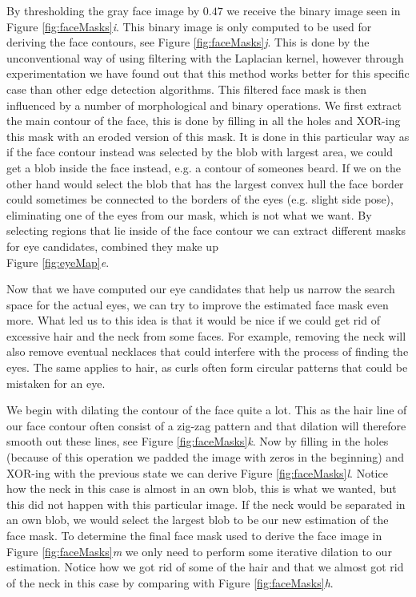 

By thresholding the gray face image by $0.47$ we receive the binary image seen in Figure \ref{fig:faceMasks}\textit{i}. This binary image is only computed to be used for deriving the face contours, see Figure \ref{fig:faceMasks}\textit{j}. This is done by the unconventional way of using filtering with the Laplacian kernel, however through experimentation we have found out that this method works better for this specific case than other edge detection algorithms. This filtered face mask is then influenced by a number of morphological and binary operations. We first extract the main contour of the face, this is done by filling in all the holes and XOR-ing this mask with an eroded version of this mask. It is done in this particular way as if the face contour instead was selected by the blob with largest area, we could get a blob inside the face instead, e.g. a contour of someones beard. If we on the other hand would select the blob that has the largest convex hull the face border could sometimes be connected to the borders of the eyes (e.g. slight side pose), eliminating one of the eyes from our mask, which is not what we want. By selecting regions that lie inside of the face contour we can extract different masks for eye candidates, combined they make up \\ Figure \ref{fig:eyeMap}\textit{e}.

Now that we have computed our eye candidates that help us narrow the search space for the actual eyes, we can try to improve the estimated face mask even more. What led us to this idea is that it would be nice if we could get rid of excessive hair and the neck 
from some faces. For example, removing the neck will also remove eventual necklaces that could interfere with the process of finding the eyes. The same applies to hair, as curls often form circular patterns that could be mistaken for an eye.

We begin with dilating the contour of the face quite a lot. This as the hair line of our face contour often consist of a zig-zag pattern and that dilation will therefore smooth out these lines, see Figure \ref{fig:faceMasks}\textit{k}. Now by filling in the holes (because of this operation we padded the image with zeros in the beginning) and XOR-ing with the previous state we can derive Figure \ref{fig:faceMasks}\textit{l}. Notice how the neck in this case is almost in an own blob, this is what we wanted, but this did not happen with this particular image. If the neck would be separated in an own blob, we would select the largest blob to be our new estimation of the face mask. To determine the final face mask used to derive the face image in Figure \ref{fig:faceMasks}\textit{m} we only need to perform some iterative dilation to our estimation. Notice how we got rid of some of the hair and that we almost got rid of the neck in this case by comparing with Figure \ref{fig:faceMasks}\textit{h}.




